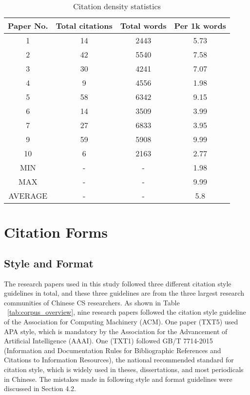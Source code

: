 \begin{table}[htb]
    \caption{Citation density statistics}
    \centering
      \begin{tabular}{cccc}
        \toprule[1.5pt]
        \textbf{Paper No.} & \textbf{Total citations} & \textbf{Total words} & \textbf{Per 1k words} \\
        \midrule[1pt]
        1 & 14 & 2443 & 5.73 \\
        2 & 42 & 5540 & 7.58\\
        3 & 30 & 4241 & 7.07\\
        4 & 9 & 4556 & 1.98\\
        5 & 58 & 6342 & 9.15\\
        6 & 14 & 3509 & 3.99\\
        7 & 27 & 6833 & 3.95\\
        9 & 59 & 5908 & 9.99\\
        10 & 6 & 2163 & 2.77\\
        MIN & - & - & 1.98\\
        MAX & - & - & 9.99\\
        AVERAGE & - & - & 5.8\\
        
      \bottomrule[1.5pt]
    \end{tabular}
    \label{tab:citation_density}
  \end{table}
\section{Citation Forms}
\subsection{Style and Format}
The research papers used in this study followed three different citation style guidelines in total, and these three guidelines are from the three largest research communities of Chinese CS researchers. As shown in Table ~\ref{tab:corpus_overview}, nine research papers followed the citation style guideline of the Association for Computing Machinery (ACM). One paper (TXT5) used APA style, which is mandatory by the Association for the Advancement of Artificial Intelligence (AAAI). One (TXT1) followed GB/T 7714-2015 (Information and Documentation Rules for Bibliographic References and Citations to Information Resources), the national recommended standard for citation style, which is widely used in theses, dissertations, and most periodicals in Chinese. The mistakes made in following style and format guidelines were discussed in Section 4.2.

